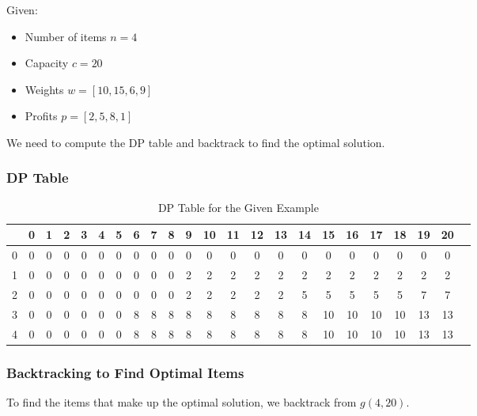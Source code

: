 \documentclass{article}
\begin{document}
Given:
\begin{itemize}
    \item Number of items \( n = 4 \)
    \item Capacity \( c = 20 \)
    \item Weights \( w = [10, 15, 6, 9] \)
    \item Profits \( p = [2, 5, 8, 1] \)
\end{itemize}

We need to compute the DP table and backtrack to find the optimal solution.

\subsubsection*{DP Table}

\begin{table}[h!]
    \centering
    \begin{tabular}{c|cccccccccccccccccccccc}
          & 0 & 1 & 2 & 3 & 4 & 5 & 6 & 7 & 8 & 9 & 10 & 11 & 12 & 13 & 14 & 15 & 16 & 17 & 18 & 19 & 20 \\
        \hline
        0 & 0 & 0 & 0 & 0 & 0 & 0 & 0 & 0 & 0 & 0 & 0  & 0  & 0  & 0  & 0  & 0  & 0  & 0  & 0  & 0  & 0  \\
        1 & 0 & 0 & 0 & 0 & 0 & 0 & 0 & 0 & 0 & 2 & 2  & 2  & 2  & 2  & 2  & 2  & 2  & 2  & 2  & 2  & 2  \\
        2 & 0 & 0 & 0 & 0 & 0 & 0 & 0 & 0 & 0 & 2 & 2  & 2  & 2  & 2  & 5  & 5  & 5  & 5  & 5  & 7  & 7  \\
        3 & 0 & 0 & 0 & 0 & 0 & 0 & 8 & 8 & 8 & 8 & 8  & 8  & 8  & 8  & 8  & 10 & 10 & 10 & 10 & 13 & 13 \\
        4 & 0 & 0 & 0 & 0 & 0 & 0 & 8 & 8 & 8 & 8 & 8  & 8  & 8  & 8  & 8  & 10 & 10 & 10 & 10 & 13 & 13 \\
    \end{tabular}
    \caption{DP Table for the Given Example}
\end{table}

\subsubsection*{Backtracking to Find Optimal Items}

To find the items that make up the optimal solution, we backtrack from \( g(4, 20) \).
\end{document}
